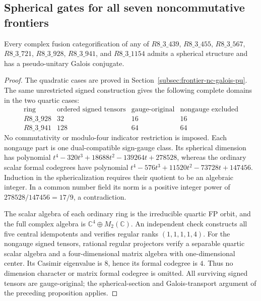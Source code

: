 \subsection{Spherical gates for all seven noncommutative frontiers}
\label{subsec:frontier-nc-quartic-and-tests}

\begin{proposition}
Every complex fusion categorification of any of
$R8\_3\_439$, $R8\_3\_455$, $R8\_3\_567$, $R8\_3\_721$,
$R8\_3\_928$, $R8\_3\_941$, and $R8\_3\_1154$
admits a spherical structure and has a pseudo-unitary Galois conjugate.
\end{proposition}
\begin{proof}
The quadratic cases are proved in
Section~\ref{subsec:frontier-nc-galois-pu}.
The same unrestricted signed construction gives the following complete
domains in the two quartic cases:
\[
\begin{array}{c|r|r|r}
\text{ring}&\text{ordered signed tensors}&\text{gauge-original}&
 \text{nongauge excluded}\\\hline
R8\_3\_928&32&16&16\\
R8\_3\_941&128&64&64
\end{array}
\]
No commutativity or modulo-four indicator restriction is imposed.
Each nongauge part is one dual-compatible sign-gauge class. Its
spherical dimension has polynomial
$t^4-320t^3+18688t^2-139264t+278528$, whereas the ordinary scalar
formal codegrees have polynomial
$t^4-576t^3+11520t^2-73728t+147456$.
Induction in the sphericalization requires their quotient to be an
algebraic integer. In a common number field its norm is a positive
integer power of $278528/147456=17/9$, a contradiction.

The scalar algebra of each ordinary ring is the irreducible quartic
FP orbit, and the full complex algebra is
$\mathbb C^4\oplus M_2(\mathbb C)$.
An independent check constructs all five central idempotents and verifies
regular ranks $(1,1,1,1,4)$. For the nongauge signed tensors, rational
regular projectors verify a separable quartic scalar algebra and a
four-dimensional matrix algebra with one-dimensional center.
Its Casimir eigenvalue is $8$, hence its formal codegree is $4$.
Thus no dimension character or matrix formal codegree is omitted.
All surviving signed tensors are gauge-original; the spherical-section
and Galois-transport argument of the preceding proposition applies.


\end{proof}
